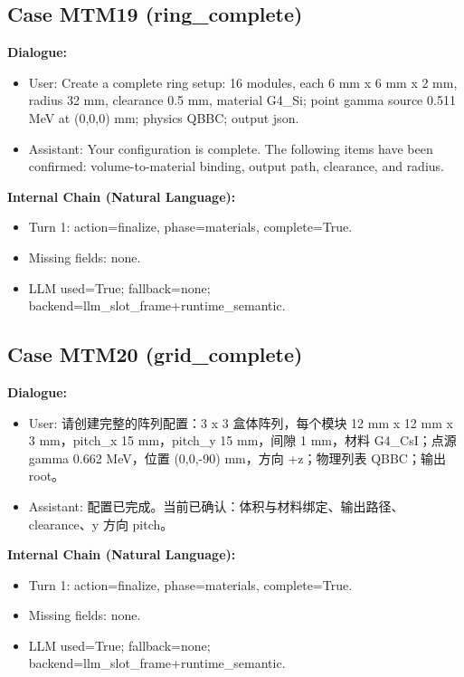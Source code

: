 \documentclass[11pt]{ctexart}
\begin{document}
\subsection{Case MTM19 (ring\_complete)}
\textbf{Dialogue:}
\begin{itemize}
\item User: Create a complete ring setup: 16 modules, each 6 mm x 6 mm x 2 mm, radius 32 mm, clearance 0.5 mm, material G4\_Si; point gamma source 0.511 MeV at (0,0,0) mm; physics QBBC; output json.
\item Assistant: Your configuration is complete. The following items have been confirmed: volume-to-material binding, output path, clearance, and radius.
\end{itemize}
\textbf{Internal Chain (Natural Language):}
\begin{itemize}
\item Turn 1: action=finalize, phase=materials, complete=True.
\item Missing fields: none.
\item LLM used=True; fallback=none; backend=llm\_slot\_frame+runtime\_semantic.
\end{itemize}
\subsection{Case MTM20 (grid\_complete)}
\textbf{Dialogue:}
\begin{itemize}
\item User: 请创建完整的阵列配置：3 x 3 盒体阵列，每个模块 12 mm x 12 mm x 3 mm，pitch\_x 15 mm，pitch\_y 15 mm，间隙 1 mm，材料 G4\_CsI；点源 gamma 0.662 MeV，位置 (0,0,-90) mm，方向 +z；物理列表 QBBC；输出 root。
\item Assistant: 配置已完成。当前已确认：体积与材料绑定、输出路径、clearance、y 方向 pitch。
\end{itemize}
\textbf{Internal Chain (Natural Language):}
\begin{itemize}
\item Turn 1: action=finalize, phase=materials, complete=True.
\item Missing fields: none.
\item LLM used=True; fallback=none; backend=llm\_slot\_frame+runtime\_semantic.
\end{itemize}
\end{document}
